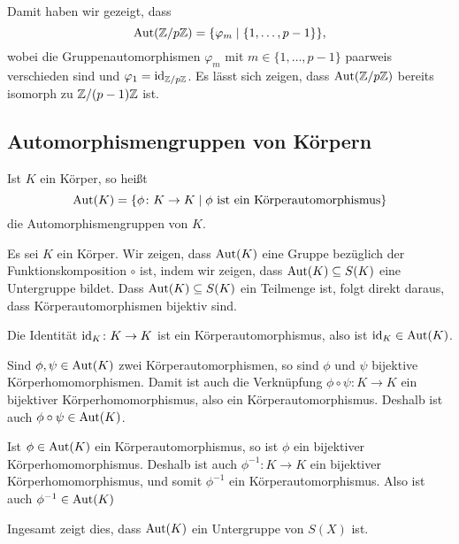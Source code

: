 \begin{bsp}
 Damit haben wir gezeigt, dass
 \[
  \mathrm{Aut}(\mathbb{Z}/p\mathbb{Z}) =  \{\varphi_m \mid \{1, \dotsc, p-1\}\},
 \]
 wobei die Gruppenautomorphismen $\varphi_m$ mit $m \in \{1, \dotsc, p-1\}$ paarweis verschieden sind und $\varphi_1 = \mathrm{id}_{\mathbb{Z}/p\mathbb{Z}}$. Es lässt sich zeigen, dass $\mathrm{Aut}(\mathbb{Z}/p\mathbb{Z})$ bereits isomorph zu $\mathbb{Z}/(p-1)\mathbb{Z}$ ist.
\end{bsp}




\subsection{Automorphismengruppen von Körpern}
\begin{defi}
 Ist $K$ ein Körper, so heißt
 \[
  \mathrm{Aut}(K) = \{\phi \colon K \to K \mid \text{$\phi$ ist ein Körperautomorphismus}\}
 \]
 die Automorphismengruppen von $K$.
\end{defi}

Es sei $K$ ein Körper. Wir zeigen, dass $\mathrm{Aut}(K)$ eine Gruppe bezüglich der Funktionskomposition $\circ$ ist, indem wir zeigen, dass $\mathrm{Aut}(K) \subseteq S(K)$ eine Untergruppe bildet. Dass $\mathrm{Aut}(K) \subseteq S(K)$ ein Teilmenge ist, folgt direkt daraus, dass Körperautomorphismen bijektiv sind.

Die Identität $\mathrm{id}_K \colon K \to K$ ist ein Körperautomorphismus, also ist $\mathrm{id}_K \in \mathrm{Aut}(K)$.

Sind $\phi, \psi \in \mathrm{Aut}(K)$ zwei Körperautomorphismen, so sind $\phi$ und $\psi$ bijektive Körperhomomorphismen. Damit ist auch die Verknüpfung $\phi \circ \psi \colon K \to K$ ein bijektiver Körperhomomorphismus, also ein Körperautomorphismus. Deshalb ist auch $\phi \circ \psi \in \mathrm{Aut}(K)$.

Ist $\phi \in \mathrm{Aut}(K)$ ein Körperautomorphismus, so ist $\phi$ ein bijektiver Körperhomomorphismus. Deshalb ist auch $\phi^{-1} \colon K \to K$ ein bijektiver Körperhomomorphismus, und somit $\phi^{-1}$ ein Körperautomorphismus. Also ist auch $\phi^{-1} \in \mathrm{Aut}(K)$

Ingesamt zeigt dies, dass $\mathrm{Aut}(K)$ ein Untergruppe von $S(X)$ ist.

